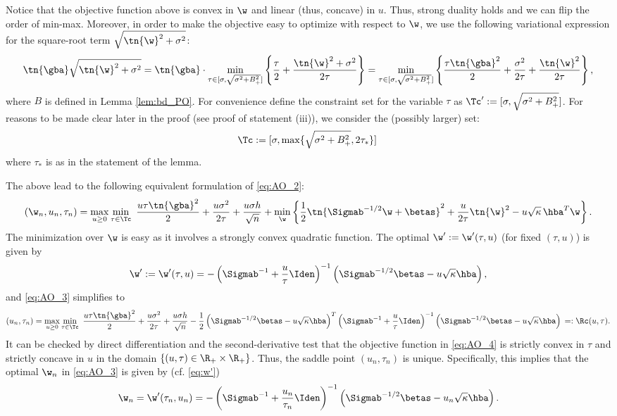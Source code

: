  Notice that the objective function above is convex in $\w$ and linear (thus, concave) in $u$. Thus, strong duality holds and we can flip the order of min-max. Moreover, in order to make the objective easy to optimize with respect to $\w$, we use the following variational expression for the square-root term $\sqrt{\tn{\w}^2+\sigma^2}$:
$$
\tn{\gba}\sqrt{\tn{\w}^2+\sigma^2} = \tn{\gba}\cdot\min_{\tau\in[\sigma,\sqrt{\sigma^2+B_+^2}]} \left\{ \frac{\tau}{2} + \frac{\tn{\w}^2+\sigma^2}{2\tau} \right\} = \min_{\tau\in[\sigma,\sqrt{\sigma^2+B_+^2}]} \left\{ \frac{\tau\tn{\gba}^2}{2} + \frac{\sigma^2}{2\tau} + \frac{\tn{\w}^2}{2\tau} \right\},
$$
where $B$ is defined in Lemma \ref{lem:bd_PO}. For convenience define the constraint set for the variable $\tau$ as $\Tc':=[\sigma,\sqrt{\sigma^2+B_+^2}]$. For reasons to be made clear later in the proof (see proof of statement (iii)), we consider the (possibly larger) set:
\[
\Tc:=[\sigma,\max\{\sqrt{\sigma^2+B_+^2},2\tau_*\}]\,
\]
where $\tau_*$ is as in the statement of the lemma.

The above lead to the following equivalent formulation of \eqref{eq:AO_2}:
\begin{align}
\left(\w_n,u_n,\tau_n\right) = \max_{u\geq 0}\min_{\tau\in\Tc} ~ \frac{u\tau\tn{\gba}^2}{2} + \frac{u\sigma^2}{2\tau} + \frac{u\sigma h}{\sqrt{n}} + \min_{\w} \left\{ \frac{1}{2}\tn{\Sigmab^{-1/2}\w+\betas}^2 + \frac{u}{2\tau}\tn{\w}^2 - u \sqrt{\kappa}\,{\hba}^T\w \right\} .\label{eq:AO_3}
\end{align}
The minimization over $\w$ is easy as it involves a strongly convex quadratic function. The optimal $\w':=\w'(\tau,u)$ (for fixed $(\tau,u)$) is given by
\begin{align}\label{eq:w'}
\w':=\w'(\tau,u) = -\left(\Sigmab^{-1}+\frac{u}{\tau}\Iden\right)^{-1}\left(\Sigmab^{-1/2}\betas-u\sqrt{\kappa}\hba\right), 
\end{align}
and \eqref{eq:AO_3} simplifies to
\begin{align}
\left(u_n,\tau_n\right)=\max_{u\geq 0}\min_{\tau\in\Tc} ~ \frac{u\tau\tn{\gba}^2}{2} + \frac{u\sigma^2}{2\tau} + \frac{u\sigma h}{\sqrt{n}} - \frac{1}{2} \left(\Sigmab^{-1/2}\betas-u\sqrt{\kappa}\hba\right)^T\left(\Sigmab^{-1}+\frac{u}{\tau}\Iden\right)^{-1} \left(\Sigmab^{-1/2}\betas-u\sqrt{\kappa}\hba\right)\,=:\Rc(u,\tau) .\label{eq:AO_4}
\end{align}
It can be checked by direct differentiation and the second-derivative test that the objective function in \eqref{eq:AO_4} is strictly convex in $\tau$ and strictly concave in $u$ in the domain $\{(u,\tau)\in\R_+\times\R_+\}$. Thus, the saddle point $(u_n,\tau_n)$ is unique. Specifically, this implies that the optimal $\w_n$ in \eqref{eq:AO_3} is given by (cf. \eqref{eq:w'})
\begin{align}\label{eq:w_n}
\w_n=\w'(\tau_n,u_n) = -\left(\Sigmab^{-1}+\frac{u_n}{\tau_n}\Iden\right)^{-1}\left(\Sigmab^{-1/2}\betas-u_n\sqrt{\kappa}\hba\right).
\end{align}


